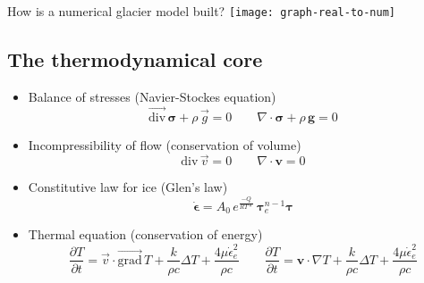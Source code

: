 \documentclass{beamer}
\newcommand{\footlineextra}[1]{\gdef\insertfootlineextra{#1}}
\begin{document}
\begin{frame}[label=real-to-num]{How is a numerical glacier model built?}
	\texttt{[image: graph-real-to-num]}
\end{frame}

\subsection{The thermodynamical core}

\begin{frame}{\insertsubsection}
	\begin{itemize}[<+->]
		\item Balance of stresses (Navier-Stockes equation)
		$$\vec{\mathrm{div}} \, \bm\sigma + \rho \, \vec{g} = 0 \qquad
			\nabla \cdot \bm\sigma + \rho \, \bm{g} = 0$$
		\item Incompressibility of flow (conservation of volume)
		$$\mathrm{div} \, \vec{v} = 0 \qquad
			\nabla \cdot \bm{v} = 0$$
		\item Constitutive law for ice (Glen's law)
		$$\bm{\dot\epsilon} = A_0 \, e^\frac{-Q}{RT*} \, \bm\tau_e^{n-1} \bm{\tau}$$
		\item Thermal equation (conservation of energy)
		$$\frac{\partial T}{\partial t}
				= \vec{v} \cdot \vec{\mathrm{grad}}\,T
				+ \frac{k}{\rho c} \Delta T
				+ \frac{4 \mu \dot \epsilon_e^2}{\rho c} \qquad
			\frac{\partial T}{\partial t}
				= \mathbf{v} \cdot \nabla T
				+ \frac{k}{\rho c} \Delta T
				+ \frac{4 \mu \dot \epsilon_e^2}{\rho c}$$
	\end{itemize}
	\footlineextra{Source: Larour et al. 2012}
\end{frame}
\end{document}

